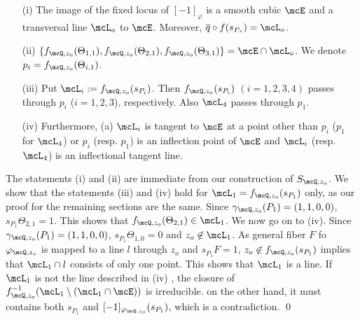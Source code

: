 \begin{lem}\label{lem:image-1}{
\begin{enumerate}
 \item[(i)]  The image of the fixed locus of $[-1]_{\varphi}$ is a smooth cubic $\mcE$ and a transversal line $\mcL_o$ to $\mcE$. Moreover, $\overline {q}\circ f(s_{P_{\tau}}) = \mcL_o$.
 
 \item[(ii)]  $\{f_{\mcQ, z_o}(\Theta_{1,1}), f_{\mcQ, z_o}(\Theta_{2,1}), f_{\mcQ, z_o}(\Theta_{3,1})\} =
 \mcE\cap \mcL_o$. We denote $p_i = f_{\mcQ, z_o}(\Theta_{i,1})$.
 
\item[(iii)]  Put $\mcL_i := f_{\mcQ, z_o}(s_{P_i})$. Then $f_{\mcQ, z_o}(s_{P_i})$ $(i =  1, 2, 3, 4)$ passes through $p_i$ ($i = 1, 2, 3$), respectively.
 Also  $\mcL_4$ passes through $p_1$.

 
 \item[(iv)] Furthermore, 
 (a) $\mcL_i$ is tangent to $\mcE$ at a point other than $p_i$ ($p_1$ for $\mcL_4$)   or 
 $p_i$ (resp. $p_1$) is an inflection point of $\mcE$ and $\mcL_i$ (resp. $\mcL_4$) is
 an inflectional tangent line.
 
 \end{enumerate}
 }
 \end{lem}
 
 \proof 
 The statements (i) and (ii) are immediate from our construction of $S_{\mcQ, z_o}$.
% 
% 
 We show that the statements (iii) and (iv) hold for $\mcL_1= f_{\mcQ, z_o}(s_{P_1})$ only, as our proof for the remaining sections are the same.
 Since $\gamma_{\mcQ, z_o}(P_1) = (1, 1, 0, 0)$, $s_{P_1}\Theta_{2,1} = 1$.
 This shows that  $f_{\mcQ, z_o}(\Theta_{2,1}) \in \mcL_1$. 
 We now go on to (iv). 
 Since $\gamma_{\mcQ, z_o}(P_1) = (1, 1, 0, 0)$, $s_{P_1}\Theta_{1,0} = 0$ and $z_o \not\in \mcL_1$.
 As general fiber
 $F$ fo $\varphi_{\mcQ, z_o}$ is mapped to a line $l$ through $z_o$ and $s_{P_1}F = 1$,
 $z_o \not\in f_{\mcQ, z_o}(s_{P_1})$ implies that $\mcL_1\cap l$ consists of only one point.  This shows that
 $\mcL_1$ is a line. If $\mcL_1$ is not the line described in (iv) , the closure
 of $f_{\mcQ, z_o}^{-1}(\mcL_1 \setminus ( \mcL_1\cap \mcE))$ is irreducible. on the other hand, it must contains
 both $s_{P_1}$ and $[-1]_{\varphi_{\mcQ, z_o}}(s_{P_1})$, which is a contradiction. \qed
  
